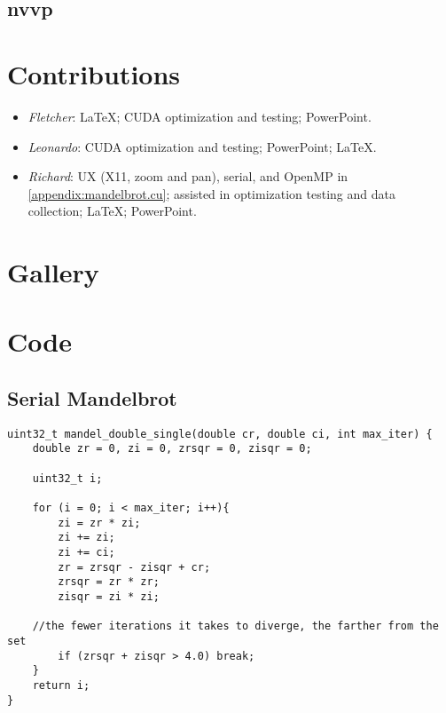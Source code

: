 \documentclass{article}
\begin{document}
    \subsection{nvvp}

\pagebreak    
\appendix
    \section{Contributions}
        \begin{itemize}
        	\item \emph{Fletcher}: \LaTeX{}; CUDA optimization and testing; PowerPoint.

        	\item \emph{Leonardo}: CUDA optimization and testing; PowerPoint; \LaTeX{}.

        	\item \emph{Richard}: UX (X11, zoom and pan), serial, and OpenMP in \ref{appendix:mandelbrot.cu}; assisted in optimization testing and data collection; \LaTeX{}; PowerPoint.
        \end{itemize}

    \section{Gallery}


    \section{Code}
        \lstset{language=C,stringstyle=\ttfamily, showstringspaces=false, numbers=left, frame=single, framexrightmargin=0pt, columns=fullflexible, breaklines=true, breakatwhitespace=true}

        \subsection{Serial Mandelbrot}\label{appendix:serial}
\begin{lstlisting}
uint32_t mandel_double_single(double cr, double ci, int max_iter) {
    double zr = 0, zi = 0, zrsqr = 0, zisqr = 0;

    uint32_t i;

    for (i = 0; i < max_iter; i++){
		zi = zr * zi;
		zi += zi;
		zi += ci;
		zr = zrsqr - zisqr + cr;
		zrsqr = zr * zr;
		zisqr = zi * zi;
		
    //the fewer iterations it takes to diverge, the farther from the set
		if (zrsqr + zisqr > 4.0) break;
    }
    return i;
}
\end{lstlisting}
\end{document}

